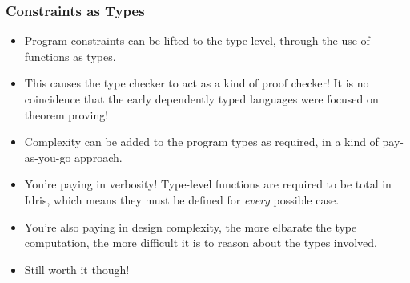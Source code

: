 \documentclass{beamer}
\begin{document}
\begin{frame}[fragile]
\frametitle{Constraints as Types}
\begin{itemize}
\item Program constraints can be lifted to the type level, through the use of
  functions as types.
\item This causes the type checker to act as a kind of proof checker! It is no
  coincidence that the early dependently typed languages were focused on
  theorem proving!
\item Complexity can be added to the program types as required, in a kind of
  pay-as-you-go approach.
\item You're paying in verbosity! Type-level functions are required to be total
  in Idris, which means they must be defined for \textit{every} possible case.
\item You're also paying in design complexity, the more elbarate the type
  computation, the more difficult it is to reason about the types involved.
\item Still worth it though!
\end{itemize}


\end{frame}
\end{document}
